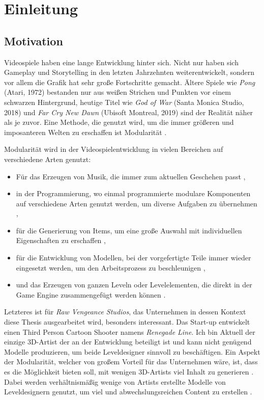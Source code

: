 \chapter{Einleitung}
\section{Motivation}
Videospiele haben eine lange Entwicklung hinter sich. Nicht nur haben sich Gameplay und Storytelling in den letzten Jahrzehnten weiterentwickelt, sondern vor allem die Grafik hat sehr große Fortschritte gemacht. Ältere Spiele wie \textit{Pong} (Atari, 1972) bestanden nur aus weißen Strichen und Punkten vor einem schwarzen Hintergrund, heutige Titel wie \textit{God of War}  (Santa Monica Studio, 2018) und \textit{Far Cry New Dawn} (Ubisoft Montreal, 2019) sind der Realität näher als je zuvor. Eine Methode, die genutzt wird, um die immer größeren und imposanteren Welten zu erschaffen ist Modularität \parencite{Burgess}.
\par
Modularität wird in der Videospielentwicklung in vielen Bereichen auf verschiedene Arten genutzt:
\begin{itemize}
\item Für das Erzeugen von Musik, die immer zum aktuellen Geschehen passt \parencite[S.\,12]{music},
\item in der Programmierung, wo einmal programmierte modulare Komponenten auf verschiedene Arten genutzt werden, um diverse Aufgaben zu übernehmen \parencite{modcode},
\item für die Generierung von Items, um eine große Auswahl mit individuellen Eigenschaften zu erschaffen \parencite{Borderlands},
\item für die Entwicklung von Modellen, bei der vorgefertigte Teile immer wieder eingesetzt werden, um den Arbeitsprozess zu beschleunigen \parencite{ForHonor},
\item und das Erzeugen von ganzen Leveln oder Levelelementen, die direkt in der Game Engine zusammengefügt werden können \parencite{Burgess}.
\end{itemize}
\par
Letzteres ist für \textit{Raw Vengeance Studios}, das Unternehmen in dessen Kontext diese Thesis ausgearbeitet wird, besonders interessant. Das Start-up entwickelt einen Third Person Cartoon Shooter namens \textit{Renegade Line}. Ich bin Aktuell der einzige 3D-Artist der an der Entwicklung beteiligt ist und kann nicht genügend Modelle produzieren, um beide Leveldesigner sinnvoll zu beschäftigen. Ein Aspekt der Modularität, welcher von großem Vorteil für das Unternehmen wäre, ist, dass es die Möglichkeit bieten soll, mit wenigen 3D-Artists viel Inhalt zu generieren \parencite{Burgess}. Dabei werden verhältnismäßig wenige von Artists erstellte Modelle von Leveldesignern genutzt, um viel und abwechslungsreichen Content zu erstellen \parencite{Burgess}.
\newpage
